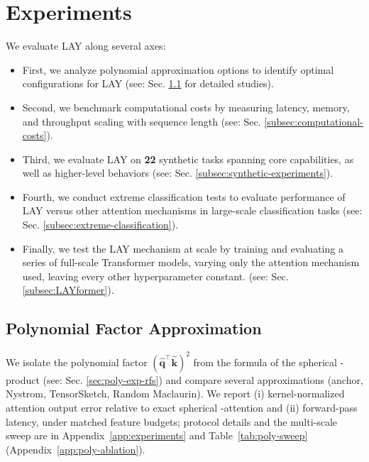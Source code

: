 \documentclass{article}
\DeclareRobustCommand{\E}{\text{\normalfont\tifinaghfont ⵟ}}
\begin{document}
\section{Experiments}
\label{sec:experiments}
We evaluate LAY along several axes:
\vspace{-3mm}
\begin{itemize}
\item First, we analyze polynomial approximation options to identify optimal configurations for LAY (see: Sec. \ref{subsec:poly-ablation} for detailed studies).
\vspace{-2mm}
\item Second, we benchmark computational costs by measuring latency, memory, and throughput scaling with sequence length (see: Sec. \ref{subsec:computational-costs}).
\vspace{-2mm}
\item  Third, we evaluate LAY on \textbf{22} synthetic tasks spanning core capabilities, as well as higher-level behaviors (see: Sec. \ref{subsec:synthetic-experiments}). 
\vspace{-2mm}
\item Fourth, we conduct extreme classification tests to evaluate performance of LAY versus other attention mechanisms in large-scale classification tasks (see: Sec. \ref{subsec:extreme-classification}). 
\vspace{-2mm}
\item Finally, we test the LAY mechanism at scale by training and evaluating a series of full-scale Transformer models, varying only the attention mechanism used, leaving every other hyperparameter constant. (see: Sec. \ref{subsec:LAYformer}).
\end{itemize}
\vspace{-3mm}
\subsection{Polynomial Factor Approximation}
\label{subsec:poly-ablation}
We isolate the polynomial factor $(\widehat{\mathbf{q}}^\top \widehat{\mathbf{k}})^2$ from the formula of the spherical \E-product (see: Sec. \ref{sec:poly-exp-rfs}) and compare several approximations (anchor, Nystrom, TensorSketch, Random Maclaurin). We report (i) kernel-normalized attention output error relative to exact spherical \E-attention and (ii) forward-pass latency, under matched feature budgets; protocol details and the multi-scale sweep are in Appendix~\ref{app:experiments} and Table~\ref{tab:poly-sweep} (Appendix~\ref{app:poly-ablation}).
\end{document}
